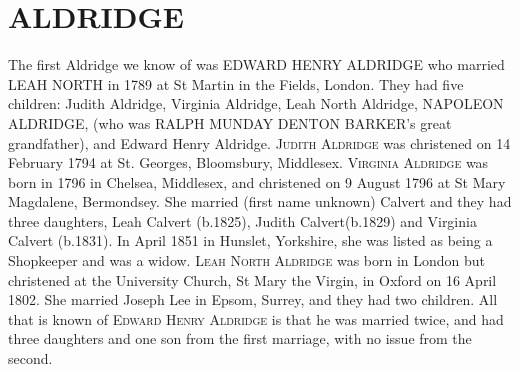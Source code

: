 \section{ALDRIDGE}

The first Aldridge we know of was \uppercase{Edward Henry Aldridge} who married \uppercase{Leah North} in 1789 at St Martin in the Fields, London. They had five children: Judith Aldridge, Virginia Aldridge, Leah North Aldridge, \uppercase{Napoleon Aldridge}, (who was \uppercase{Ralph Munday Denton Barker}'s great grandfather), and Edward Henry Aldridge. 
\textsc{Judith Aldridge} was christened on 14 February 1794 at St. Georges,	Bloomsbury, Middlesex.
\textsc{Virginia Aldridge} was born in 1796 in Chelsea, Middlesex, and christened on 9 August 1796 at St Mary Magdalene,  	Bermondsey. She married  (first name unknown) Calvert and they had three daughters, Leah Calvert (b.1825), Judith Calvert(b.1829) and Virginia Calvert (b.1831). In April 1851 in	Hunslet, Yorkshire, she was listed as being a Shopkeeper and was a widow.
\textsc{Leah North Aldridge} was born in London but christened at the University Church, St Mary the Virgin, in Oxford on 16 April 1802. She married Joseph Lee in Epsom, Surrey, and they had two children.
All that is known of \textsc{Edward Henry Aldridge} is that he was married twice, and had three daughters and one son from the first marriage,  with no issue from the second. 

